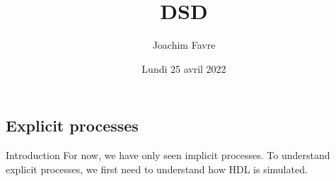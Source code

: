 \documentclass[a4paper]{article}
\title{DSD}
\author{Joachim Favre}
\date{Lundi 25 avril 2022}
\begin{document}
\maketitle


\subsection{Explicit processes}
\begin{parag}{Introduction}
    For now, we have only seen implicit processes. To understand explicit processes, we first need to understand how HDL is simulated.
\end{parag}
\end{document}
